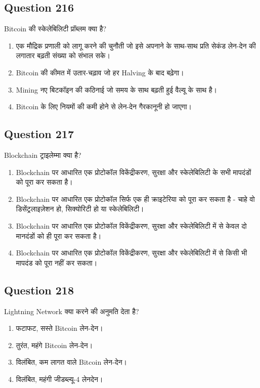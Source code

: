 \documentclass[12pt,a4paper]{article}
\begin{document}
\bigskip


\subsection*{Question 216}
Bitcoin की स्केलेबिलिटी प्रॉब्लम क्या है?

\begin{enumerate}[label=\Alph*., leftmargin=*]
\item एक मौद्रिक प्रणाली को लागू करने की चुनौती जो इसे अपनाने के साथ-साथ प्रति सेकंड लेन-देन की लगातार बढ़ती संख्या को संभाल सके।
\item Bitcoin की कीमत में उतार-चढ़ाव जो हर Halving के बाद बढ़ेगा।
\item Mining नए बिटकॉइन की कठिनाई जो समय के साथ बढ़ती हुई वैल्यू के साथ है।
\item Bitcoin के लिए नियमों की कमी होने से लेन-देन गैरकानूनी हो जाएगा।
\end{enumerate}

\bigskip


\subsection*{Question 217}
Blockchain ट्राइलेम्मा क्या है?

\begin{enumerate}[label=\Alph*., leftmargin=*]
\item Blockchain पर आधारित एक प्रोटोकॉल विकेंद्रीकरण, सुरक्षा और स्केलेबिलिटी के सभी मापदंडों को पूरा कर सकता है।
\item Blockchain पर आधारित एक प्रोटोकॉल सिर्फ एक ही क्राइटेरिया को पूरा कर सकता है - चाहे वो डिसेंट्रलाइज़ेशन हो, सिक्योरिटी हो या स्केलेबिलिटी।
\item Blockchain पर आधारित एक प्रोटोकॉल विकेंद्रीकरण, सुरक्षा और स्केलेबिलिटी में से केवल दो मानदंडों को ही पूरा कर सकता है।
\item Blockchain पर आधारित एक प्रोटोकॉल विकेंद्रीकरण, सुरक्षा और स्केलेबिलिटी में से किसी भी मापदंड को पूरा नहीं कर सकता।
\end{enumerate}

\bigskip


\subsection*{Question 218}
Lightning Network क्या करने की अनुमति देता है?

\begin{enumerate}[label=\Alph*., leftmargin=*]
\item फटाफट, सस्ते Bitcoin लेन-देन।
\item तुरंत, महंगे Bitcoin लेन-देन।
\item विलंबित, कम लागत वाले Bitcoin लेन-देन।
\item विलंबित, महंगी जीडब्ल्यू-4 लेनदेन।
\end{enumerate}
\end{document}
